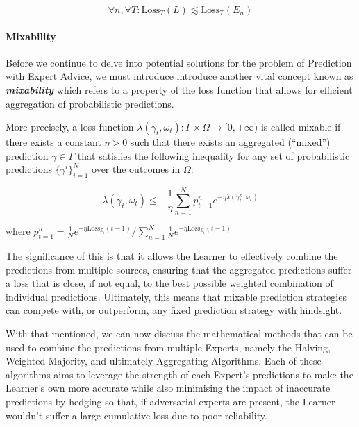 \begin{equation}
    \forall n, \forall T: \text{Loss}_T(L) \lesssim \text{Loss}_T(E_n)
\end{equation}

\paragraph{Mixability}\label{paragaph:mixability}
Before we continue to delve into potential solutions for the problem of Prediction with Expert Advice, we must introduce introduce another vital concept known as \textbf{\textit{mixability}} which refers to a property of the loss function that allows for efficient aggregation of probabilistic predictions.

More precisely, a loss function $\lambda(\gamma_t, \omega_t): \Gamma \times \Omega \rightarrow [0, +\infty)$ is called mixable if there exists a constant $\eta > 0$ such that there exists an aggregated (``mixed'') prediction $\gamma \in \Gamma$ that satisfies the following inequality for any set of probabilistic predictions $\{\gamma^i\}^N_{i=1}$ over the outcomes in $\Omega$:~\cite{kalnishkan:2022}

\begin{equation}
    \lambda(\gamma_t, \omega_t) \leq - \frac{1}{\eta}\underset{n=1}{\overset{N}{\sum}} p^n_{t-1} e^{-\eta\lambda(\gamma^n_t, \omega_t)}
\end{equation}

where $p^n_{t=1} = \frac{1}{N}e^{-\eta \text{Loss}_{\mathcal{E}_i}(t-1)}/{\sum^N_{n=1}\frac{1}{N}e^{-\eta\text{Loss}_{\mathcal{E}_i}(t-1)}}$\newline

The significance of this is that it allows the Learner to effectively combine the predictions from multiple sources, ensuring that the aggregated predictions suffer a loss that is close, if not equal, to the best possible weighted combination of individual predictions. Ultimately, this means that mixable prediction strategies can compete with, or outperform, any fixed prediction strategy with hindsight.

With that mentioned, we can now discuss the mathematical methods that can be used to combine the predictions from multiple Experts, namely the Halving, Weighted Majority, and ultimately Aggregating Algorithms. Each of these algorithms aims to leverage the strength of each Expert's predictions to make the Learner's own more accurate while also minimising the impact of inaccurate predictions by hedging so that, if adversarial experts are present, the Learner wouldn't suffer a large cumulative loss due to poor reliability.

